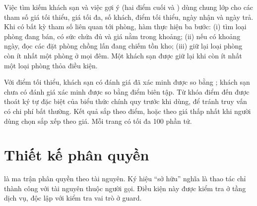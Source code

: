 Việc tìm kiếm khách sạn và việc gợi ý (hai điểm cuối  và ) dùng chung lớp  cho các tham số giá tối thiểu, giá tối đa, số khách, điểm tối thiểu, ngày nhận và ngày trả. Khi có bất kỳ tham số liên quan tới phòng, hàm  thực hiện ba bước: (i) tìm loại phòng đang bán, có sức chứa đủ và giá nằm trong khoảng; (ii) nếu có khoảng ngày, đọc các đặt phòng chồng lấn đang chiếm tồn kho; (iii) giữ lại loại phòng còn ít nhất một phòng ở mọi đêm. Một khách sạn được giữ lại khi còn ít nhất một loại phòng thỏa điều kiện.

Với điểm tối thiểu, khách sạn có đánh giá đã xác minh được so bằng ; khách sạn chưa có đánh giá xác minh được so bằng điểm biên tập. Từ khóa điểm đến được thoát ký tự đặc biệt của biểu thức chính quy trước khi dùng, để tránh truy vấn có chi phí bất thường. Kết quả sắp theo điểm, hoặc theo giá thấp nhất khi người dùng chọn sắp xếp theo giá. Mỗi trang có tối đa 100 phần tử.

\section{Thiết kế phân quyền}\label{sec:rbac-design}

 là ma trận phân quyền theo tài nguyên. Ký hiệu ``sở hữu'' nghĩa là thao tác chỉ thành công với tài nguyên thuộc người gọi. Điều kiện này được kiểm tra ở tầng dịch vụ, độc lập với kiểm tra vai trò ở guard.

